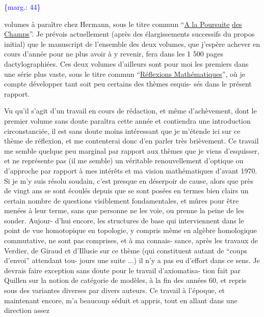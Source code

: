 \documentclass[11pt]{article}
\newcommand{\scanpage}[1]{\par\bigskip\noindent{\small\sffamily[scan #1]}\par}
\newcommand{\mspage}[1]{{\small\sffamily[p.\,#1]}}
\newcommand{\margin}[1]{\textcolor{blue}{\{\textsf{marg.:} #1\}}}
\newcommand{\uline}[1]{\underline{#1}}
\begin{document}
\margin{44}

\clearpage
\scanpage{119/45}
\mspage{43}

volumes à paraître chez Hermann, sous le titre commun ``\uline{A la Poursuite}
\uline{des Champs}''. Je prévois actuellement (après des élargissements
successifs du propos initial) que le manuscript de l'ensemble des
deux volumes, que j'espère achever en cours d'année pour ne plus
avoir à y revenir, fera dans les 1 500 pages dactylographiées.
Ces deux volumes d'ailleurs sont pour moi les premiers dans une
série plus vaste, sous le titre commun ``\uline{Réflexions Mathématiques}'',
où je compte développer tant soit peu certains des thèmes esquis-%
sés dans le présent rapport.

Vu qu'il s'agit d'un travail en cours de rédaction,
et même d'achèvement, dont le premier volume sans doute paraîtra
cette année et contiendra une introduction circonstanciée, il
est sans doute moins intéressant que je m'étende ici sur ce thème
de réflexion, et me contenterai donc d'en parler très brièvement.
Ce travail me semble quelque peu marginal par rapport aux thèmes
que je viens d'esquisser, et ne représente pas (il me semble) un
véritable renouvellement d'optique ou d'approche par rapport à
mes intérêts et ma vision mathématiques d'avant 1970. Si je m'y
suis résolu soudain, c'est presque en déserpoir de cause, alors
que près de vingt ans se sont écoulés depuis que se sont posées
en termes bien clairs un certain nombre de questions visiblement
fondamentales, et mûres pour être menées à leur terme, sans que
personne ne les voie, ou prenne la peine de les sonder. Aujour-%
d'hui encore, les structures de base qui interviennent dans le
point de vue homotopique en topologie, y compris même en algèbre
homologique commutative, ne sont pas comprises, et à ma connais-%
sance, après les travaux de Verdier, de Giraud et d'Illusie sur
ce thème (qui constituent autant de ``coups d'envoi'' attendant tou-%
jours une suite ...) il n'y a pas eu d'effort dans ce sens. Je
devrais faire exception sans doute pour le travail d'axiomatisa-%
tion fait par Quillen sur la notion de catégorie de modèles, à
la fin des années 60, et repris sous des variantes diverses par
divers auteurs. Ce travail à l'époque, et maintenant encore, m'a
beaucoup séduit et appris, tout en allant dans une direction assez
\end{document}
